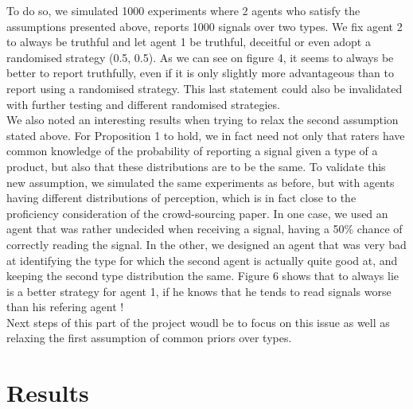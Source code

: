 \documentclass{scrartcl}
\begin{document}
To do so, we simulated 1000 experiments where 2 agents who satisfy the assumptions presented above, reports 1000 signals over two types. We fix agent 2 to always be truthful and let agent 1 be truthful, deceitful or even adopt a randomised strategy (0.5, 0.5). As we can see on figure 4, it seems to always be better to report truthfully, even if it is only slightly more advantageous than to report using a randomised strategy. This last statement could also be invalidated with further testing and different randomised strategies.\\

We also noted an interesting results when trying to relax the second assumption stated above. For Proposition 1 to hold, we in fact need not only that  raters have common knowledge of the probability of reporting a signal given a type of a product, but also that these distributions are to be the same. To validate this new assumption, we simulated the same experiments as before, but with agents having different distributions of perception, which is in fact close to the proficiency consideration of the crowd-sourcing paper. In one case, we used an agent that was rather undecided when receiving a signal, having a 50\% chance of correctly reading the signal. In the other, we designed an agent that was very bad at identifying the type for which the second agent is actually quite good at, and keeping the second type distribution the same. Figure 6 shows that to always lie is a better strategy for agent 1, if he knows that he tends to read signals worse than his refering agent !\\ 

Next steps of this part of the project woudl be to focus on this issue as well as relaxing the first assumption of common priors over types.
\section{Results}
\end{document}
